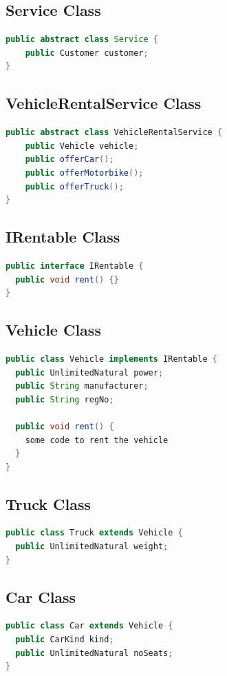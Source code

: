 \documentclass[12pt]{article}
\begin{document}
\subsection*{Service Class}
\begin{lstlisting}[language=Java]
public abstract class Service {
    public Customer customer;
}
\end{lstlisting}

\newpage
\subsection*{VehicleRentalService Class}
\begin{lstlisting}[language=Java]
public abstract class VehicleRentalService {
    public Vehicle vehicle;
    public offerCar();
    public offerMotorbike();
    public offerTruck();
}
\end{lstlisting}


\subsection*{IRentable Class}
\begin{lstlisting}[language=Java]
public interface IRentable {
  public void rent() {}
}
\end{lstlisting}


\subsection*{Vehicle Class}
\begin{lstlisting}[language=Java]
public class Vehicle implements IRentable {
  public UnlimitedNatural power;
  public String manufacturer;
  public String regNo;

  public void rent() {
    some code to rent the vehicle
  }
}
\end{lstlisting}
\subsection*{Truck Class}
\begin{lstlisting}[language=Java]
public class Truck extends Vehicle {
  public UnlimitedNatural weight;
}
\end{lstlisting}
\subsection*{Car Class}
\begin{lstlisting}[language=Java]
public class Car extends Vehicle {
  public CarKind kind;
  public UnlimitedNatural noSeats;
}
\end{lstlisting}
\end{document}
